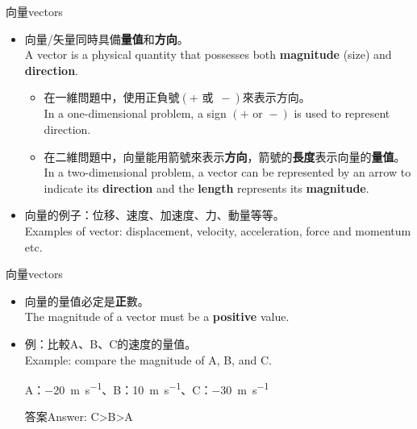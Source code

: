 \documentclass[beamer=true]{standalone}
\begin{document}
\begin{frame}{向量vectors}
    \begin{itemize}
        \item 向量/矢量同時具備\textbf{量值}和\textbf{方向}。\\A vector is a physical quantity that possesses both \textbf{magnitude} (size) and \textbf{direction}.
              \begin{itemize}
                  \item 在一維問題中，使用正負號$(+ \textrm{ 或 }\, -)$來表示方向。\\In a one-dimensional problem, a sign $(+ \textrm{ or } -)$ is used to represent direction.
                  \item 在二維問題中，向量能用箭號來表示\textbf{方向}，箭號的\textbf{長度}表示向量的\textbf{量值}。\\In a two-dimensional problem, a vector can be represented by an arrow to indicate its \textbf{direction} and the \textbf{length} represents its \textbf{magnitude}.
              \end{itemize}
        \item 向量的例子：位移、速度、加速度、力、動量等等。\\Examples of vector: displacement, velocity, acceleration, force and momentum etc.
    \end{itemize}

\end{frame}


\begin{frame}{向量vectors}

    \begin{itemize}
        \item 向量的量值必定是\textbf{正}數。\\The magnitude of a vector must be a \textbf{positive} value.
        \item 例：比較A、B、C的速度的量值。\\Example: compare the magnitude of A, B, and C.\par A：\qty{-20}{m.s^{-1}}、B：\qty{10}{m.s^{-1}}、C：\qty{-30}{m.s^{-1}}\par 答案Answer: C>B>A
    \end{itemize}

\end{frame}
\end{document}
